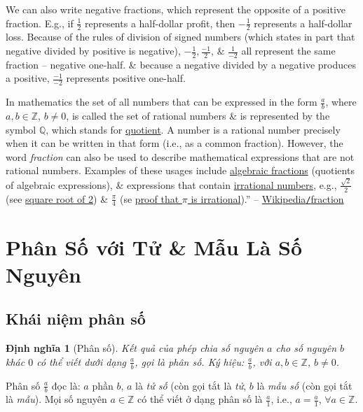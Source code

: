 \documentclass{article}
\newtheorem{dinhnghia}{Định nghĩa}
\begin{document}
We can also write negative fractions, which represent the opposite of a positive fraction. E.g., if $\frac{1}{2}$ represents a half-dollar profit, then $-\frac{1}{2}$ represents a half-dollar loss. Because of the rules of division of signed numbers (which states in part that negative divided by positive is negative), $-\frac{1}{2},\frac{-1}{2}$, \& $\frac{1}{-2}$ all represent the same fraction -- negative one-half. \& because a negative divided by a negative produces a positive, $\frac{-1}{-2}$ represents positive one-half.

In mathematics the set of all numbers that can be expressed in the form $\frac{a}{b}$, where $a,b\in\mathbb{Z}$, $b\ne0$, is called the set of rational numbers \& is represented by the symbol $\mathbb{Q}$, which stands for \href{https://en.wikipedia.org/wiki/Quotient}{quotient}. A number is a rational number precisely when it can be written in that form (i.e., as a common fraction). However, the word \textit{fraction} can also be used to describe mathematical expressions that are not rational numbers. Examples of these usages include \href{https://en.wikipedia.org/wiki/Algebraic_fraction}{algebraic fractions} (quotients of algebraic expressions), \& expressions that contain \href{https://en.wikipedia.org/wiki/Irrational_number}{irrational numbers}, e.g., $\frac{\sqrt{2}}{2}$ (see \href{https://en.wikipedia.org/wiki/Square_root_of_2}{square root of 2}) \& $\frac{\pi}{4}$ (se \href{https://en.wikipedia.org/wiki/Proof_that_%CF%80_is_irrational}{proof that $\pi$ is irrational}).'' -- \href{https://en.wikipedia.org/wiki/Fraction}{Wikipedia\texttt{/}fraction}
 

\section{Phân Số với Tử \& Mẫu Là Số Nguyên}

\subsection{Khái niệm phân số}

\begin{dinhnghia}[Phân số]
	Kết quả của phép chia số nguyên $a$ cho số nguyên $b$ khác $0$ có thể viết dưới dạng $\frac{a}{b}$, gọi là \emph{phân số}. Ký hiệu: $\frac{a}{b}$, với $a,b\in\mathbb{Z}$, $b\ne0$.
\end{dinhnghia}
Phân số $\frac{a}{b}$ đọc là: $a$ phần $b$, $a$ là \textit{tử số} (còn gọi tắt là \textit{tử}, $b$ là \textit{mẫu số} (còn gọi tắt là \textit{mẫu}). Mọi số nguyên $a\in\mathbb{Z}$ có thể viết ở dạng phân số là $\frac{a}{1}$, i.e., $a = \frac{a}{1}$, $\forall a\in\mathbb{Z}$.
\end{document}
